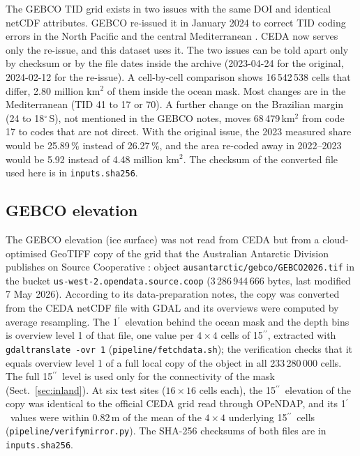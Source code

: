 \documentclass[essd, manuscript]{copernicus}
\newcommand{\as}{$^{\prime\prime}$}      %
\newcommand{\am}{$^{\prime}$}            %
\renewcommand{\_}{\usorig\allowbreak}
\begin{document}
The GEBCO\_2023 TID grid exists in two issues with the same DOI and identical netCDF attributes.
GEBCO re-issued it in January 2024 to correct TID coding errors in the North Pacific and the central Mediterranean \citep{gebcodoc2026}.
CEDA now serves only the re-issue, and this dataset uses it.
The two issues can be told apart only by checksum or by the file dates inside the archive (2023-04-24 for the original, 2024-02-12 for the re-issue).
A cell-by-cell comparison shows 16\,542\,538 cells that differ, 2.80 million km$^2$ of them inside the ocean mask.
Most changes are in the Mediterranean (TID 41 to 17 or 70).
A further change on the Brazilian margin (24 to 18$^\circ$\,S), not mentioned in the GEBCO notes, moves 68\,479\,km$^2$ from code 17 to codes that are not direct.
With the original issue, the 2023 measured share would be 25.89\,\% instead of 26.27\,\%, and the area re-coded away in 2022--2023 would be 5.92 instead of 4.48 million km$^2$.
The checksum of the converted file used here is in \texttt{inputs.sha256}.

\subsection{GEBCO\_2026 elevation}

The GEBCO\_2026 elevation (ice surface) was not read from CEDA but from a cloud-optimised GeoTIFF copy of the grid that the Australian Antarctic Division publishes on Source Cooperative \citep{aad2026gebcocog}: object \texttt{ausantarctic/gebco/GEBCO\_2026.tif} in the bucket \texttt{us-west-2.opendata.source.coop} (3\,286\,944\,666 bytes, last modified 7 May 2026).
According to its data-preparation notes, the copy was converted from the CEDA netCDF file with GDAL and its overviews were computed by average resampling.
The 1\am\ elevation behind the ocean mask and the depth bins is overview level 1 of that file, one value per $4 \times 4$ cells of 15\as, extracted with \texttt{gdal\_translate -ovr 1} (\texttt{pipeline/fetch\_data.sh}); the verification checks that it equals overview level 1 of a full local copy of the object in all 233\,280\,000 cells.
The full 15\as\ level is used only for the connectivity of the mask (Sect.~\ref{sec:inland}).
At six test sites ($16 \times 16$ cells each), the 15\as\ elevation of the copy was identical to the official CEDA grid read through OPeNDAP, and its 1\am\ values were within 0.82\,m of the mean of the $4 \times 4$ underlying 15\as\ cells (\texttt{pipeline/verify\_mirror.py}).
The SHA-256 checksums of both files are in \texttt{inputs.sha256}.
\end{document}
